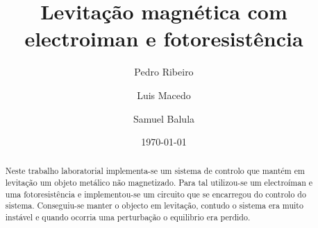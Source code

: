 \documentclass[%
  reprint,
  nofootinbib,
  amsmath,amssymb,
  aps,
  10pt,
  a4paper
]{revtex4-1}
\begin{document}


 

\title{Levitação magnética com electroiman e fotoresistência}

\author{Pedro Ribeiro}%
\author{Luis Macedo}%
\author{Samuel Balula}%



\date{\today}

\begin{abstract}
Neste trabalho laboratorial implementa-se um sistema de controlo que mantém em levitação um objeto metálico não magnetizado. Para tal utilizou-se um electroíman e uma fotoresistência e implementou-se um circuito que se encarregou do controlo do sistema. Conseguiu-se manter o objecto em levitação, contudo o sistema era muito instável e quando ocorria uma perturbação o equilibrio era perdido.


\end{abstract}
\maketitle
\end{document}
